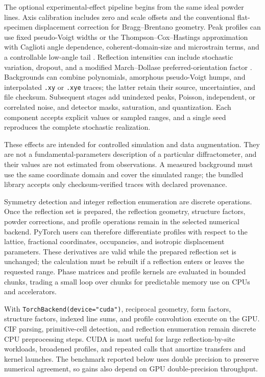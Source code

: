 \documentclass[10pt]{article}
\begin{document}
The optional experimental-effect pipeline begins from the same ideal powder
lines. Axis calibration includes zero and scale offsets and the conventional
flat-specimen displacement correction for Bragg--Brentano geometry. Peak
profiles can use fixed pseudo-Voigt widths or the
Thompson--Cox--Hastings approximation with Caglioti angle dependence,
coherent-domain-size and microstrain terms, and a controllable low-angle tail
\citep{caglioti1958,dinnebier2021}. Reflection intensities can include
stochastic variation, dropout, and a modified March--Dollase
preferred-orientation factor \citep{dollase1986}. Backgrounds can combine
polynomials, amorphous pseudo-Voigt humps, and interpolated \texttt{.xy} or
\texttt{.xye} traces; the latter retain their source, uncertainties, and file
checksum. Subsequent stages add unindexed peaks, Poisson, independent, or
correlated noise, and detector masks, saturation, and quantization. Each
component accepts explicit values or sampled ranges, and a single seed
reproduces the complete stochastic realization.

These effects are intended for controlled simulation and data augmentation.
They are not a fundamental-parameters description of a particular
diffractometer, and their values are not estimated from observations. A
measured background must use the same coordinate domain and cover the simulated
range; the bundled library accepts only checksum-verified traces with declared
provenance.

Symmetry detection and integer reflection enumeration are discrete operations.
Once the reflection set is prepared, the reflection geometry, structure factors,
powder corrections, and profile operations remain in the selected numerical
backend. PyTorch users can therefore differentiate profiles with respect to the
lattice, fractional coordinates, occupancies, and isotropic displacement
parameters. These derivatives are valid while the prepared reflection set is
unchanged; the calculation must be rebuilt if a reflection enters or leaves the
requested range. Phase matrices and profile kernels are evaluated in bounded
chunks, trading a small loop over chunks for predictable memory use on CPUs and
accelerators.

With \texttt{TorchBackend(device="cuda")}, reciprocal geometry, form factors,
structure factors, indexed line sums, and profile convolution execute on the
GPU. CIF parsing, primitive-cell detection, and reflection enumeration remain
discrete CPU preprocessing steps. CUDA is most useful for
large reflection-by-site workloads, broadened profiles, and repeated calls that
amortize transfers and kernel launches. The benchmark reported below uses
double precision to preserve numerical agreement, so gains also depend on GPU
double-precision throughput.
\end{document}

